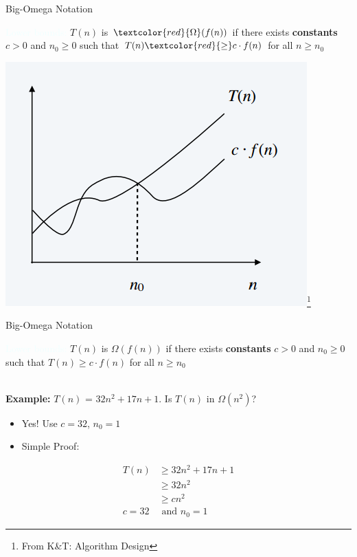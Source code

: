 \documentclass{beamer}
\newcommand{\tblue}[1]{{\Large {\textcolor{azure}{#1}}}}
\newcommand{\hred}[1]{{\textcolor{red}{#1}}}
\begin{document}
\begin{frame}{Big-Omega Notation}

\tblue{Lower bounds:} $T(n)$ is $\hred{\Omega}(f(n))$ if there exists {\bf constants} $c>0$ and $n_0 \geq 0$ such that
$T(n) \hred{\geq} c \cdot f(n)$ for all $n \geq n_0$
\begin{center}
    \includegraphics[scale=0.4]{bigOmega.png}\footnote{From K\&T: Algorithm Design}
\end{center}
\end{frame}


\begin{frame}{Big-Omega Notation}

\tblue{Lower bounds:} $T(n)$ is $\Omega(f(n))$ if there exists {\bf constants} $c>0$ and $n_0 \geq 0$ such that
$T(n) \geq c \cdot f(n)$ for all $n \geq n_0$

~\\
\textbf{Example:} $T(n)$ = $32n^2+17n+1$.  Is $T(n)$ in $\Omega(n^2)$? 
\begin{itemize}
\item Yes! Use $c=32$, $n_0=1$
\item Simple Proof:
\end{itemize}
\begin{align*}
T(n) &\geq 32n^2+17n+1 \\
&\geq 32n^2\\
&\geq cn^2\\
c=32    &   \text{ and } n_0=1
\end{align*}
\end{frame}
\end{document}

